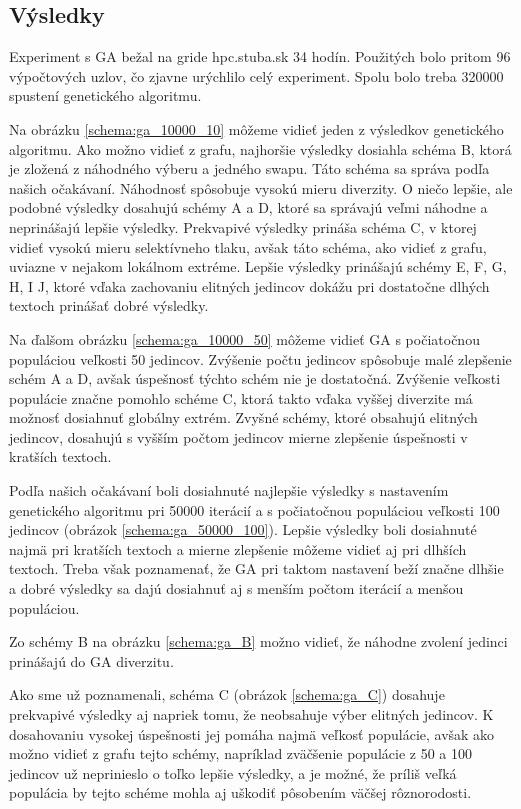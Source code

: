 \subsection{Výsledky}
Experiment s GA bežal na gride hpc.stuba.sk 34 hodín.
Použitých bolo pritom 96 výpočtových uzlov, čo zjavne urýchlilo celý experiment.
Spolu bolo treba 320000 spustení genetického algoritmu.

Na obrázku \ref{schema:ga_10000_10} môžeme vidieť jeden z výsledkov genetického algoritmu.
Ako možno vidieť z grafu, najhoršie výsledky dosiahla schéma B, ktorá je zložená z náhodného výberu a jedného swapu. Táto schéma sa správa podľa našich očakávaní. Náhodnosť spôsobuje vysokú mieru diverzity.
O niečo lepšie, ale podobné výsledky dosahujú schémy A a D, ktoré sa správajú veľmi náhodne a neprinášajú lepšie výsledky.
Prekvapivé výsledky prináša schéma C, v ktorej vidieť vysokú mieru selektívneho tlaku, avšak táto schéma, ako vidieť z grafu, uviazne v nejakom lokálnom extréme.
Lepšie výsledky prinášajú schémy E, F, G, H, I J, ktoré vďaka zachovaniu elitných jedincov dokážu pri dostatočne dlhých textoch prinášať dobré výsledky.


Na ďalšom obrázku \ref{schema:ga_10000_50} môžeme vidieť GA s počiatočnou populáciou veľkosti 50 jedincov. Zvýšenie počtu jedincov spôsobuje malé zlepšenie  schém A a D, avšak úspešnosť týchto schém nie je dostatočná. Zvýšenie veľkosti populácie značne pomohlo schéme C, ktorá takto vďaka vyššej diverzite má možnosť dosiahnuť globálny extrém. Zvyšné schémy, ktoré obsahujú elitných jedincov, dosahujú s vyšším počtom jedincov mierne zlepšenie úspešnosti v kratších textoch.


Podľa našich očakávaní boli dosiahnuté najlepšie výsledky s nastavením genetického algoritmu pri 50000 iterácií a s počiatočnou populáciou veľkosti 100 jedincov (obrázok \ref{schema:ga_50000_100}). Lepšie výsledky boli dosiahnuté najmä pri kratších textoch a mierne zlepšenie môžeme vidieť aj pri dlhších textoch. Treba však poznamenať, že GA pri taktom nastavení beží značne dlhšie a dobré výsledky sa dajú dosiahnuť aj s menším počtom iterácií a menšou populáciou. 


Zo schémy B na obrázku \ref{schema:ga_B} možno vidieť, že náhodne zvolení jedinci prinášajú do GA diverzitu.


Ako sme už poznamenali, schéma C (obrázok \ref{schema:ga_C}) dosahuje prekvapivé výsledky aj napriek tomu, že neobsahuje výber elitných jedincov. K dosahovaniu vysokej úspešnosti jej pomáha najmä veľkosť populácie, avšak ako možno vidieť z grafu tejto schémy, napríklad zväčšenie populácie z 50 a 100 jedincov už neprinieslo o toľko lepšie výsledky, a je možné, že príliš veľká populácia by tejto schéme mohla aj uškodiť pôsobením väčšej rôznorodosti.


